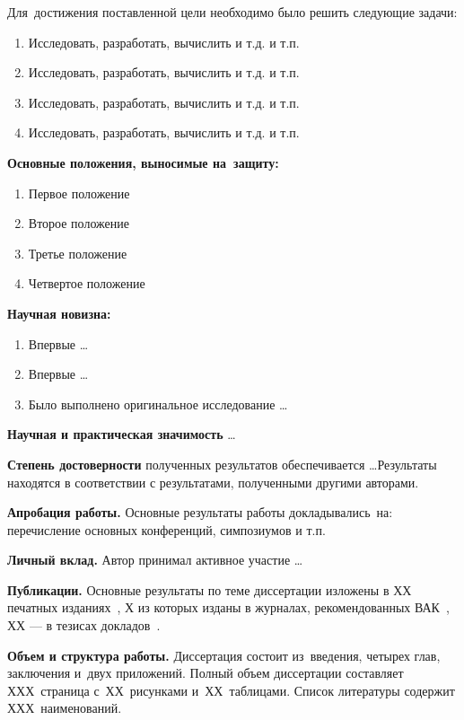 Для~достижения поставленной цели необходимо было решить следующие задачи:
\begin{enumerate}
  \item Исследовать, разработать, вычислить и т.д. и т.п.
  \item Исследовать, разработать, вычислить и т.д. и т.п.
  \item Исследовать, разработать, вычислить и т.д. и т.п.
  \item Исследовать, разработать, вычислить и т.д. и т.п.
\end{enumerate}

\textbf{Основные положения, выносимые на~защиту:}
\begin{enumerate}
  \item Первое положение
  \item Второе положение
  \item Третье положение
  \item Четвертое положение
\end{enumerate}

\textbf{Научная новизна:}
\begin{enumerate}
  \item Впервые \ldots
  \item Впервые \ldots
  \item Было выполнено оригинальное исследование \ldots
\end{enumerate}

\textbf{Научная и практическая значимость} \ldots

\textbf{Степень достоверности} полученных результатов обеспечивается \ldots Результаты находятся в соответствии с результатами, полученными другими авторами.

\textbf{Апробация работы.}
Основные результаты работы докладывались~на:
перечисление основных конференций, симпозиумов и т.п.

\textbf{Личный вклад.} Автор принимал активное участие \ldots

\textbf{Публикации.} Основные результаты по теме диссертации изложены в ХХ печатных изданиях~\cite{bib1,bib2,bib3,bib4,bib5},
Х из которых изданы в журналах, рекомендованных ВАК~\cite{bib1,bib2,bib3}, 
ХХ --- в тезисах докладов~\cite{bib4,bib5}.

\textbf{Объем и структура работы.} Диссертация состоит из~введения, четырех глав, заключения и~двух приложений. Полный объем диссертации составляет ХХХ~страница с~ХХ~рисунками и~ХХ~таблицами. Список литературы содержит ХХХ~наименований.

\clearpage